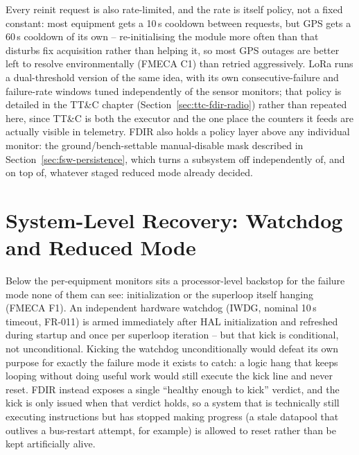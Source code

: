 Every reinit request is also rate-limited, and the rate is itself policy,
not a fixed constant: most equipment gets a 10\,s cooldown between requests,
but GPS gets a 60\,s cooldown of its own -- re-initialising the module more
often than that disturbs fix acquisition rather than helping it, so most
GPS outages are better left to resolve environmentally (FMECA C1) than
retried aggressively. LoRa runs a dual-threshold version of the same idea,
with its own consecutive-failure and failure-rate windows tuned
independently of the sensor monitors; that policy is detailed in the TT\&C
chapter (Section~\ref{sec:ttc-fdir-radio}) rather than repeated here, since
TT\&C is both the executor and the one place the counters it feeds are
actually visible in telemetry. FDIR also holds a policy layer above any
individual monitor: the ground/bench-settable manual-disable mask described
in Section~\ref{sec:fsw-persistence}, which turns a subsystem off
independently of, and on top of, whatever staged reduced mode already
decided.

\section{System-Level Recovery: Watchdog and Reduced Mode}
\label{sec:fsw-reduced-mode}

Below the per-equipment monitors sits a processor-level backstop for the
failure mode none of them can see: initialization or the superloop itself
hanging (FMECA F1). An independent hardware watchdog (IWDG, nominal
10\,s timeout, FR-011) is armed immediately after HAL initialization and
refreshed during startup and once per superloop iteration -- but that
kick is conditional, not unconditional. Kicking the watchdog
unconditionally would defeat its own purpose for exactly the failure mode
it exists to catch: a logic hang that keeps looping without doing useful
work would still execute the kick line and never reset. FDIR instead
exposes a single ``healthy enough to kick'' verdict, and the kick is only
issued when that verdict holds, so a system that is technically still
executing instructions but has stopped making progress (a stale datapool
that outlives a bus-restart attempt, for example) is allowed to reset
rather than be kept artificially alive.

